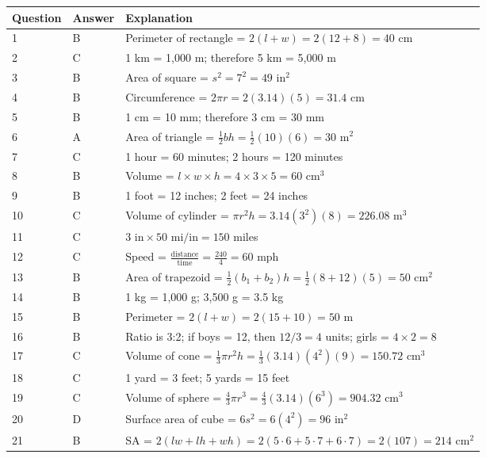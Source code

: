 \documentclass[12pt, letterpaper]{article}
\begin{document}
\begin{table}[h]
\centering
\begin{tabular}{|p{1.5cm}|p{1.5cm}|p{9.5cm}|}
\hline
\textbf{Question} & \textbf{Answer} & \textbf{Explanation} \\
\hline
1 & B & Perimeter of rectangle = $2(l + w) = 2(12 + 8) = 40$ cm \\
\hline
2 & C & 1 km = 1,000 m; therefore 5 km = 5,000 m \\
\hline
3 & B & Area of square = $s^2 = 7^2 = 49$ in$^2$ \\
\hline
4 & B & Circumference = $2\pi r = 2(3.14)(5) = 31.4$ cm \\
\hline
5 & B & 1 cm = 10 mm; therefore 3 cm = 30 mm \\
\hline
6 & A & Area of triangle = $\frac{1}{2}bh = \frac{1}{2}(10)(6) = 30$ m$^2$ \\
\hline
7 & C & 1 hour = 60 minutes; 2 hours = 120 minutes \\
\hline
8 & B & Volume = $l \times w \times h = 4 \times 3 \times 5 = 60$ cm$^3$ \\
\hline
9 & B & 1 foot = 12 inches; 2 feet = 24 inches \\
\hline
10 & C & Volume of cylinder = $\pi r^2 h = 3.14(3^2)(8) = 226.08$ m$^3$ \\
\hline
11 & C & $3 \text{ in} \times 50 \text{ mi/in} = 150$ miles \\
\hline
12 & C & Speed = $\frac{\text{distance}}{\text{time}} = \frac{240}{4} = 60$ mph \\
\hline
13 & B & Area of trapezoid = $\frac{1}{2}(b_1 + b_2)h = \frac{1}{2}(8 + 12)(5) = 50$ cm$^2$ \\
\hline
14 & B & 1 kg = 1,000 g; 3,500 g = 3.5 kg \\
\hline
15 & B & Perimeter = $2(l + w) = 2(15 + 10) = 50$ m \\
\hline
16 & B & Ratio is 3:2; if boys = 12, then $12/3 = 4$ units; girls = $4 \times 2 = 8$ \\
\hline
17 & C & Volume of cone = $\frac{1}{3}\pi r^2 h = \frac{1}{3}(3.14)(4^2)(9) = 150.72$ cm$^3$ \\
\hline
18 & C & 1 yard = 3 feet; 5 yards = 15 feet \\
\hline
19 & C & Volume of sphere = $\frac{4}{3}\pi r^3 = \frac{4}{3}(3.14)(6^3) = 904.32$ cm$^3$ \\
\hline
20 & D & Surface area of cube = $6s^2 = 6(4^2) = 96$ in$^2$ \\
\hline
21 & B & SA = $2(lw + lh + wh) = 2(5 \cdot 6 + 5 \cdot 7 + 6 \cdot 7) = 2(107) = 214$ cm$^2$ \\

\end{tabular}
\end{table}
\end{document}
